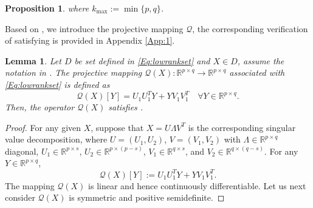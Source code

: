 \documentclass[11pt,a4paper,reqno]{amsart}
\newtheorem{lemma}[theorem]{Lemma}
\newtheorem{proposition}[theorem]{Proposition}
\begin{document}
{\begin{proposition}
    where $k_{\max}:=\min\{p,q\}$.
\end{proposition}
Based on , we introduce the projective mapping $\mathcal Q$, the corresponding verification of satisfying  is provided in Appendix \ref{App:1}.
\begin{lemma}\label{Lem:Qlowrank}
    Let $D$ be set defined in \eqref{Eq:lowrankset} and $X \in D$, assume the notation in . The projective mapping $\mathcal Q (X): \mathbb R^{p\times q} \to \mathbb R^{p \times q}$ associated with \eqref{Eq:lowrankset} is defined as 
    \begin{equation}\label{Eq:Qlowrank}
        \mathcal Q(X)[Y]= U_1U_1^TY+YV_1V_1^T \quad \forall Y\in \mathbb R^{p\times q}.
    \end{equation}
    Then, the operator $\mathcal Q(X)$ satisfies .
\end{lemma}
\begin{proof}
    For any given $X$, suppose that $X=U\Lambda V^T$ is the corresponding singular value decomposition, where $U=(U_1, U_2)$, $V=(V_1, V_2)$ with $\Lambda \in \mathbb R^{p\times q}$ diagonal, $U_1 \in \mathbb R^{p \times s}$,  $U_2 \in \mathbb R^{p \times (p-s)}$, $V_1 \in \mathbb R^{q \times s}$, and $V_2 \in \mathbb R^{q \times (q-s)}$. For any $Y\in \mathbb R^{p\times q}$,
\begin{equation*}
    \mathcal Q(X)[Y]:=U_1U_1^TY+YV_1V_1^T.
\end{equation*}
The mapping $\mathcal Q(X)$ is linear and hence continuously differentiable. Let us next consider $\mathcal Q(X)$ is symmetric and positive semidefinite.


\end{proof}}
\end{document}
